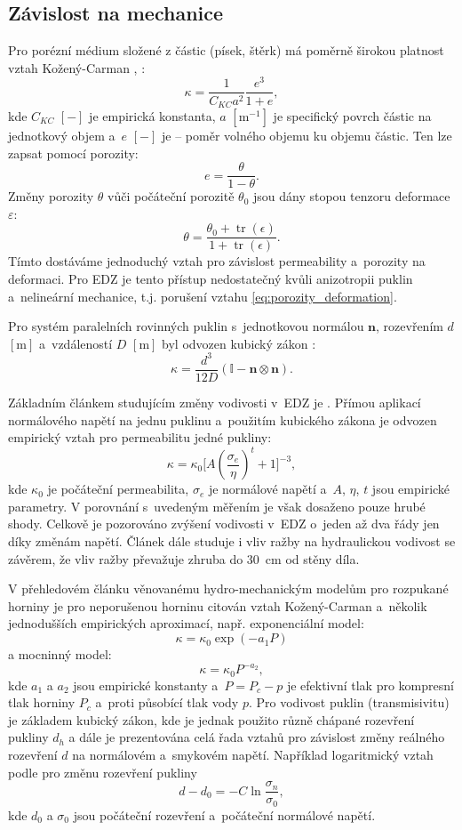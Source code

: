 \documentclass{article}
\def\eps{\varepsilon}
\def\tr{\operatorname{tr}}
\def\vc#1{\mathbf{\boldsymbol{#1}}}     %
\def\tn#1{{\mathbb{#1}}}    %
\begin{document}
\subsection{Závislost na mechanice}
\label{sec:empiricke}

Pro porézní médium složené z částic (písek, štěrk) má poměrně širokou platnost vztah Kožený-Carman \cite{Carman1956}, \cite{Carrier2003}:
\begin{equation}
  \label{eq:Kozeny}
  \kappa = \frac{1}{C_{KC}a^2}\frac{e^3}{1+e},
\end{equation}
kde $C_{KC}$ $[-]$ je empirická konstanta, $a$  $[\mathrm{m}^{-1}]$ je specifický povrch částic na jednotkový objem a~$e$ $[-]$ je   --
poměr volného objemu ku objemu částic. Ten lze zapsat pomocí porozity:
\[
   e = \frac{\theta}{1 - \theta}.
\]
Změny porozity $\theta$ vůči počáteční porozitě $\theta_0$ jsou dány stopou tenzoru deformace $\eps$:
\begin{equation}
   \label{eq:porozity_deformation}
   \theta = \frac{\theta_0 + \tr(\epsilon)}{1 + \tr(\epsilon)}.
\end{equation}
Tímto dostáváme jednoduchý vztah pro závislost permeability a~porozity na deformaci. Pro EDZ je tento přístup nedostatečný kvůli anizotropii
puklin a~nelineární mechanice, t.j.  porušení vztahu \eqref{eq:porozity_deformation}.

Pro systém paralelních rovinných puklin s~jednotkovou normálou $\vc n$, rozevřením $d$ $[\mathrm{m}]$ a~vzdáleností $D$ $[\mathrm{m}]$
byl odvozen kubický zákon \cite{Snow1969}:
\[
 \kappa = \frac{d^3}{12 D} (\tn I - \vc n \otimes \vc n).
\]

Základním článkem studujícím změny vodivosti v~EDZ je \cite{Kelsall1984}. Přímou aplikací normálového napětí
na jednu puklinu a~použitím kubického zákona je odvozen empirický vztah pro permeabilitu jedné pukliny:
\[
  \kappa = \kappa_0 \Big[A (\frac{\sigma_e}{\eta})^t+1\Big]^{-3},
\]
kde $\kappa_0$ je počáteční permeabilita, $\sigma_e$ je normálové napětí a~$A$, $\eta$, $t$ jsou empirické parametry.
V porovnání s~uvedeným měřením je však dosaženo pouze hrubé shody. Celkově je pozorováno zvýšení vodivosti v~EDZ o~jeden až dva řády jen díky změnám napětí.
Článek dále studuje i vliv ražby na hydraulickou vodivost se závěrem, že vliv ražby převažuje zhruba do 30~cm od stěny díla. 


V přehledovém článku \cite{Rutqvist2003} věnovanému hydro-mechanickým modelům pro rozpukané horniny
je pro neporušenou horninu citován vztah Kožený-Carman a~několik jednodušších empirických aproximací, např.
exponenciální model:
\[
  \kappa=\kappa_0 \exp(-a_1 P)
\]
a 
mocninný model:
\[
  \kappa=\kappa_0 P^{-a_2},
\]
kde $a_1$ a $a_2$ jsou empirické konstanty a~$P=P_c - p$ je efektivní tlak pro kompresní tlak horniny $P_c$ a~proti působící tlak vody $p$.
Pro vodivost puklin (transmisivitu) je základem kubický zákon, kde je jednak použito různě chápané  rozevření pukliny $d_h$ 
a dále je prezentována celá řada vztahů pro závislost změny reálného rozevření $d$ na normálovém a~smykovém napětí. Například logaritmický vztah 
podle \cite{Kohl1995} pro změnu rozevření pukliny
\[
   d - d_0 = - C \ln \frac{\sigma_n}{\sigma_0},
\]
kde $d_0$ a $\sigma_0$ jsou počáteční rozevření a~počáteční normálové napětí. 
\end{document}
